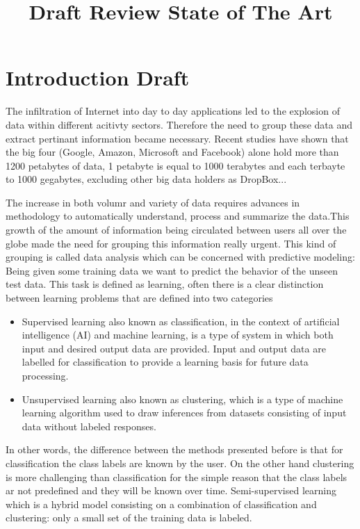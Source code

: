 \documentclass[]{article}
\title{Draft Review State of The Art }
\author{}
\begin{document}
\maketitle

\begin{abstract}

\end{abstract}

\section{Introduction Draft}

The infiltration of Internet into day to day applications led to the explosion of data within different acitivty sectors. Therefore the need to group these data and extract pertinant information became necessary. Recent studies have shown that the big four (Google, Amazon, Microsoft and Facebook) alone hold more than 1200 petabytes of data, 1 petabyte is equal to 1000 terabytes and each terbayte to 1000 gegabytes, excluding other big data holders as DropBox...

\noindent The increase in both volumr and variety of data requires advances in methodology to automatically understand, process and summarize the data\cite{jain2008data}.This growth of the amount of information being circulated between users all over the globe made the need for grouping this information really urgent. This kind of grouping is called data analysis which can be concerned with predictive modeling: Being given some training data we want to predict the behavior of the unseen test data. This task is defined as learning, often there is a clear distinction between learning problems that are defined into two categories 

\begin{itemize}
 \item Supervised learning also known as classification, in the context of artificial intelligence (AI) and machine learning, is a type of system in which both input and desired output data are provided. Input and output data are labelled for classification to provide a learning basis for future data processing.
 \item Unsupervised learning also known as clustering, which is a type of machine learning algorithm used to draw inferences from datasets consisting of input data without labeled responses. 
\end{itemize}

\noindent In other words, the difference between the methods presented before is that for classification the class labels are known by the user. On the other hand clustering is more challenging than classification for the simple reason that the class labels ar not predefined and they will be known over time. Semi-supervised learning which is a hybrid model\cite{chapelle2006continuation} consisting on a combination of classification and clustering: only a small set of the training data is labeled.
\end{document}
